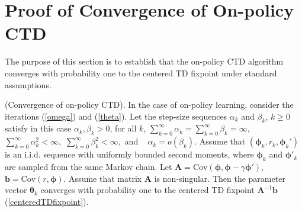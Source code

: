 \section{Proof of Convergence of On-policy CTD}
The purpose of this section
is to establish that the  on-policy CTD algorithm converges with probability one
to the centered TD fixpoint
 under standard assumptions.
\begin{theorem}
    \label{theorem1}(Convergence of on-policy CTD).
    In the case of on-policy learning, consider the iterations (\ref{omega}) and (\ref{theta}).
    Let the step-size sequences $\alpha_k$ and $\beta_k$, $k\geq 0$ satisfy in this case $\alpha_k,\beta_k>0$, for all $k$,
    $
    \sum_{k=0}^{\infty}\alpha_k=\sum_{k=0}^{\infty}\beta_k=\infty,
    $
    $
    \sum_{k=0}^{\infty}\alpha_k^2<\infty,
    $
    $
    \sum_{k=0}^{\infty}\beta_k^2<\infty,
    $
    and  
    $
    \alpha_k = o(\beta_k).
    $
    Assume that $(\bm{\bm{\phi}}_k,r_k,\bm{\bm{\phi}}_k')$ is an i.i.d. sequence with
    uniformly bounded second moments, where $\bm{\bm{\phi}}_k$ and $\bm{\bm{\phi}}'_{k}$ are sampled from the same Markov chain.
    Let $\textbf{A} = \mathrm{Cov}(\bm{\bm{\phi}},\bm{\bm{\phi}}-\gamma\bm{\bm{\phi}}')$,
    $\bm{b}=\mathrm{Cov}(r,\bm{\bm{\phi}})$.
    Assume that matrix $\textbf{A}$ is non-singular. 
    Then the parameter vector $\bm{\bm{\theta}}_k$ converges with probability one 
    to the centered TD fixpoint $\textbf{A}^{-1}\bm{b}$ (\ref{centeredTDfixpoint}).
   \end{theorem}
